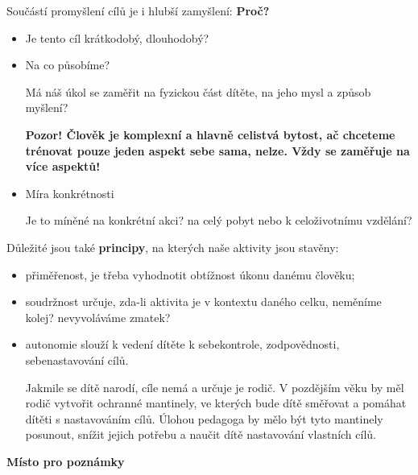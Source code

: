 \documentclass[a4paper,12pt]{report}
\begin{document}
Součástí promyšlení cílů je i hlubší zamyšlení: \textbf{Proč?} 

\begin{itemize}
 \item Je tento cíl krátkodobý, dlouhodobý?
 \item Na co působíme?
 
Má náš úkol se zaměřit na fyzickou část dítěte, na jeho mysl a způsob myšlení?

\textbf{Pozor! Člověk je komplexní a hlavně celistvá bytost, ač chceteme trénovat pouze jeden aspekt sebe sama, nelze. Vždy se zaměřuje na více aspektů!}

 \item Míra konkrétnosti
 
 Je to míněné na konkrétní akci? na celý pobyt nebo k celoživotnímu vzdělání?
\end{itemize}

Důležité jsou také \textbf{principy}, na kterých naše aktivity jsou stavěny:
\begin{itemize}
 \item přiměřenost, je třeba vyhodnotit obtížnost úkonu danému člověku;
 \item soudržnost určuje, zda-li aktivita je v kontextu daného celku, neměníme kolej? nevyvoláváme zmatek?
 \item autonomie slouží k vedení dítěte k sebekontrole, zodpovědnosti, sebenastavování cílů.
 
 Jakmile se dítě narodí, cíle nemá a určuje je rodič. V pozdějším věku by měl rodič vytvořit ochranné mantinely, ve kterých bude dítě směřovat a pomáhat dítěti s nastavováním cílů. Úlohou pedagoga by mělo být tyto mantinely posunout, snížit jejich potřebu a naučit dítě nastavování vlastních cílů.
\end{itemize}

\pagelogos
\begin{samepage}\begin{flushleft}
\end{flushleft}
\textbf{Místo pro poznámky}
\begin{center}
\end{center}
\vspace{2cm}\pagelogos
\end{samepage}
\end{document}
